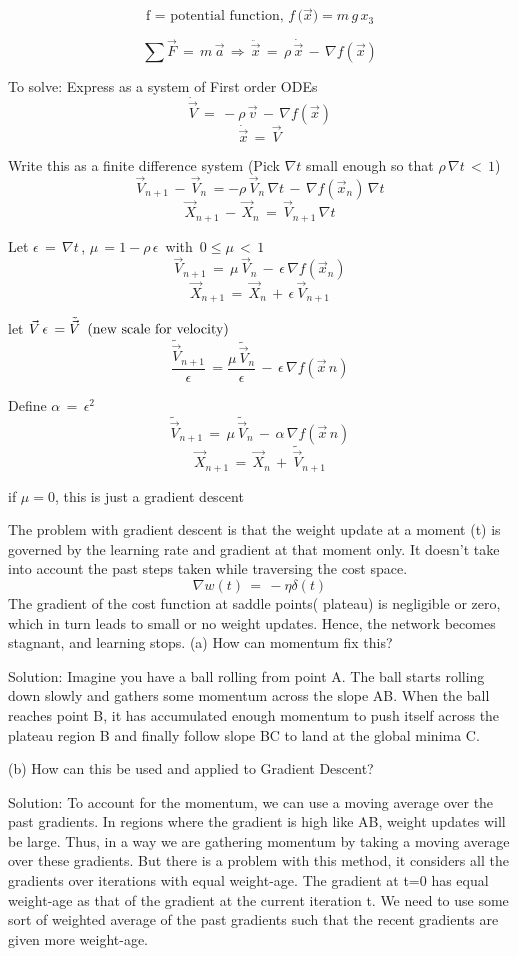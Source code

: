 $$\text {f = potential function,  } {f\,({\vec{x})=m\,g\,x_3}}$$

$$\sum{\vec{F}\,=\,m\,\vec{a}\,\Longrightarrow\,\ddot{\vec{x}}}\,=\,\rho\,\dot{\vec{x}}\,-\,\nabla{f}(\vec{x})$$


To solve: Express as a system of First order ODEs
$$
\dot{\vec{V}}\,=\,-\rho\,\vec{v}\,-\,\nabla{f}(\vec{x})$$
$$\dot{\vec{x}}\,=\,\vec{V}$$

Write this as a finite difference system
(Pick $\nabla{t}$ small enough so that $\rho\,\nabla{t}\,<\,1$)
$$
\vec{V}_{n+1}\,-\,\vec{V}_n\,=-\rho\,\vec{V}_n\,\nabla{t}\,-\,\nabla{f(\vec{x}_n)}\,\nabla{t}
$$
$$
\vec{X}_{n+1}\,-\,\vec{X}_n\,=\,\vec{V}_{n+1}\,\nabla{t}
$$

Let $\epsilon\,=\,\nabla{t}\,$,$\,\,\mu\,=1-\rho\,\epsilon\,$ with$\,\,\,0\leq\mu\,<\,1$
$$
\vec{V}_{n+1}\,=\,\mu\,\vec{V}_n\,-\,\epsilon\,\nabla{f(\vec{x}_n)}
$$
$$
\vec{X}_{n+1}\,=\,\vec{X}_n\,+\,\epsilon\,\vec{V}_{n+1}
$$

let $\vec{V}\,\epsilon\,=\Tilde{\vec{V}}\,\,\,\text{(new scale for velocity)}$
$$
\frac{\tilde{\vec{V}}_{n+1}}{\epsilon}\,=\frac{\mu\,\tilde{\vec{V}}_{n}}{\epsilon}\,-\,\epsilon\,\nabla{f(\vec{x}\,n)}
$$

Define $\alpha\,=\,\epsilon^2$
$$
\tilde{\vec{V}}_{n+1}\,=\,\mu\,\tilde{\vec{V}}_n\,-\,\alpha\,\nabla{f(\vec{x}\,n)}$$
$$
\vec{X}_{n+1}\,=\,\vec{X}_n\,+\,\tilde{\vec{V}}_{n+1}$$

if $\mu=0$, this is just a gradient descent

\begin{example}
The problem with gradient descent is that the weight update at a moment (t) is governed by the learning rate and gradient at that moment only. It doesn’t take into account the past steps taken while traversing the cost space.
$$\nabla{w(t)}\,=\,-\eta\delta(t)$$
The gradient of the cost function at saddle points( plateau) is negligible or zero, which in turn leads to small or no weight updates. Hence, the network becomes stagnant, and learning stops.
(a) How can momentum fix this?


Solution: Imagine you have a ball rolling from point A. The ball starts rolling down slowly and gathers some momentum across the slope AB. When the ball reaches point B, it has accumulated enough momentum to push itself across the plateau region B and finally follow slope BC to land at the global minima C.

(b) How can this be used and applied to Gradient Descent?


Solution: To account for the momentum, we can use a moving average over the past gradients. In regions where the gradient is high like AB, weight updates will be large. Thus, in a way we are gathering momentum by taking a moving average over these gradients. But there is a problem with this method, it considers all the gradients over iterations with equal weight-age. The gradient at t=0 has equal weight-age as that of the gradient at the current iteration t. We need to use some sort of weighted average of the past gradients such that the recent gradients are given more weight-age.

\end{example}



